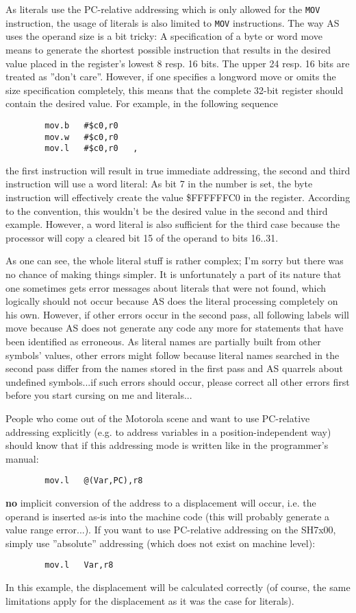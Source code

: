 \documentclass[12pt,twoside]{report}
\newcommand{\bb}[1]{{\bf #1}}
\newcommand{\tty}[1]{{\tt #1}}
\newcommand{\asname}{{AS}}
\begin{document}
As literals use the PC-relative addressing which is only allowed for
the \tty{MOV} instruction, the usage of literals is also limited to
\tty{MOV} instructions.  The way \asname{} uses the operand size is a bit tricky:
A specification of a byte or word move means to generate the shortest
possible instruction that results in the desired value placed in the
register's lowest 8 resp. 16 bits.  The upper 24 resp. 16 bits are treated
as ''don't care''.  However, if one specifies a longword move or omits the
size specification completely, this means that the complete 32-bit
register should contain the desired value.  For example, in the following
sequence
\begin{verbatim}
        mov.b   #$c0,r0
        mov.w   #$c0,r0
        mov.l   #$c0,r0   ,
\end{verbatim}
the first instruction will result in true immediate addressing, the
second and third instruction will use a word literal:  As bit 7 in
the number is set, the byte instruction will effectively create the
value \$FFFFFFC0 in the register.  According to the convention, this
wouldn't be the desired value in the second and third example.
However, a word literal is also sufficient for the third case because
the processor will copy a cleared bit 15 of the operand to bits
16..31.

As one can see, the whole literal stuff is rather complex; I'm sorry but
there was no chance of making things simpler.  It is unfortunately a
part of its nature that one sometimes gets error messages about
literals that were not found, which logically should not occur because
\asname{} does the literal processing completely on his own.  However, if
other errors occur in the second pass, all following labels will move
because \asname{} does not generate any code any more for statements that
have been identified as erroneous.  As literal names are partially built
from other symbols' values, other errors might follow because literal
names searched in the second pass differ from the names stored in the
first pass and \asname{} quarrels about undefined symbols...if such errors
should occur, please correct all other errors first before you start
cursing on me and literals...

People who come out of the Motorola scene and want to use PC-relative
addressing explicitly (e.g. to address variables in a position-independent
way) should know that if this addressing mode is written like in the
programmer's manual:
\begin{verbatim}
        mov.l   @(Var,PC),r8
\end{verbatim}
\bb{no} implicit conversion of the address to a displacement will occur,
i.e. the operand is inserted as-is into the machine code (this will
probably generate a value range error...).  If you want to use
PC-relative addressing on the SH7x00, simply use ''absolute''
addressing (which does not exist on machine level):
\begin{verbatim}
        mov.l   Var,r8
\end{verbatim}
In this example, the displacement will be calculated correctly (of
course, the same limitations apply for the displacement as it was the
case for literals).
\end{document}
